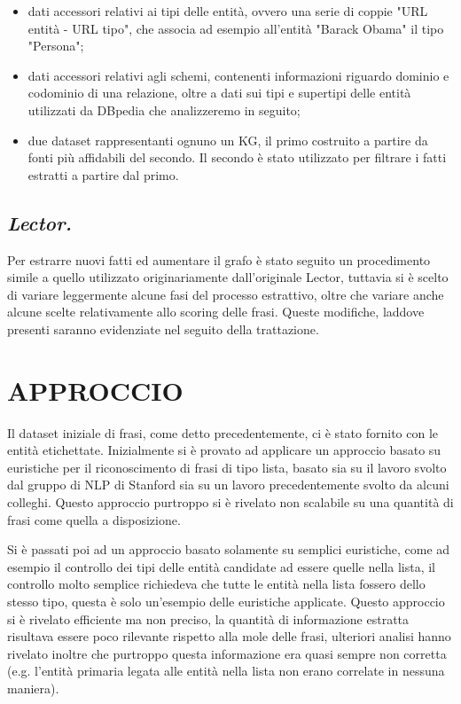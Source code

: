 \documentclass[10pt,a4paper,twocolumn]{article}
\begin{document}
\begin{itemize}
\item dati accessori relativi ai tipi delle entità, ovvero una serie di coppie "URL entità - URL tipo", che associa ad esempio all'entità "Barack Obama" il tipo "Persona";

\item dati accessori relativi agli schemi, contenenti informazioni riguardo dominio e codominio di una relazione, oltre a dati sui tipi e supertipi delle entità utilizzati da DBpedia che analizzeremo in seguito;

\item due dataset rappresentanti ognuno un KG, il primo costruito a partire da fonti più affidabili del secondo. Il secondo è stato utilizzato per filtrare i fatti estratti a partire dal primo.
\end{itemize}

\subsection*{\textit{Lector.}}

Per estrarre nuovi fatti ed aumentare il grafo è stato seguito un procedimento simile a quello utilizzato originariamente dall'originale  Lector, tuttavia si è scelto di variare leggermente alcune fasi del processo estrattivo, oltre che variare anche alcune scelte relativamente allo scoring delle frasi. Queste modifiche, laddove presenti saranno evidenziate nel seguito della trattazione.

\section{APPROCCIO}

Il dataset iniziale di frasi, come detto precedentemente, ci è stato fornito con le entità etichettate. Inizialmente si è provato ad applicare un approccio basato su euristiche per il riconoscimento di frasi di tipo lista, basato sia su il lavoro svolto dal gruppo di NLP di Stanford sia su un lavoro precedentemente svolto da alcuni colleghi. Questo approccio purtroppo si è rivelato non scalabile su una quantità di frasi come quella a disposizione. 

Si è passati poi ad un approccio basato solamente su semplici euristiche, come ad esempio il controllo dei tipi delle entità candidate ad essere quelle nella lista, il controllo molto semplice richiedeva che tutte le entità nella lista fossero dello stesso tipo, questa è solo un'esempio delle euristiche applicate. Questo approccio si è rivelato efficiente ma non preciso, la quantità di informazione estratta risultava essere poco rilevante rispetto alla mole delle frasi, ulteriori analisi hanno rivelato inoltre che purtroppo questa informazione era quasi sempre non corretta (e.g. l'entità primaria legata alle entità nella lista non erano correlate in nessuna maniera).
\end{document}
